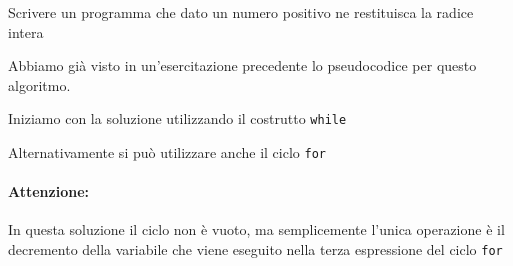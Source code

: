 \begin{Exercise}[label={ex:radice}]
  Scrivere un programma che dato un numero positivo ne restituisca la radice intera
\end{Exercise}

\begin{Answer}[ref={ex:radice}]
	Abbiamo già visto in un'esercitazione precedente lo pseudocodice per questo algoritmo.
	
	Iniziamo con la soluzione utilizzando il costrutto \texttt{while}
  

	Alternativamente si può utilizzare anche il ciclo \texttt{for}
	

	\paragraph{Attenzione: }
			In questa soluzione il ciclo non è vuoto, ma semplicemente l'unica operazione è il decremento della variabile che viene eseguito nella terza espressione del ciclo \texttt{for}
\end{Answer}
